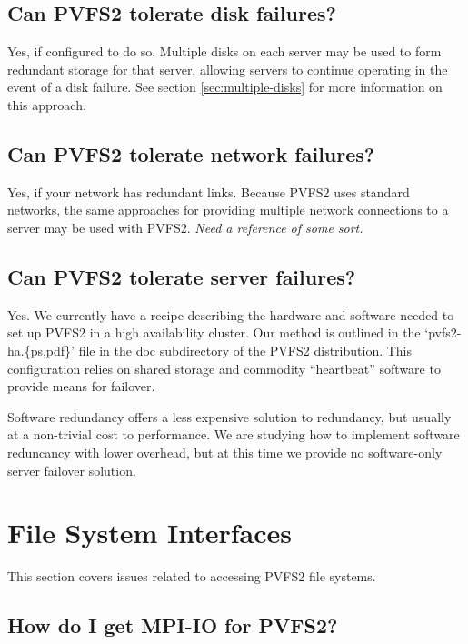 \documentclass[11pt,letterpaper]{article}
\begin{document}
\subsection{Can PVFS2 tolerate disk failures?}

Yes, if configured to do so.  Multiple disks on each server may be used to
form redundant storage for that server, allowing servers to continue operating
in the event of a disk failure.  See section \ref{sec:multiple-disks} for more
information on this approach.

\subsection{Can PVFS2 tolerate network failures?}

Yes, if your network has redundant links.  Because PVFS2 uses standard
networks, the same approaches for providing multiple network connections to a
server may be used with PVFS2.  \emph{Need a reference of some sort.}

\subsection{Can PVFS2 tolerate server failures?}

Yes.  We currently have a recipe describing the hardware and software
needed to set up PVFS2 in a high availability cluster.  Our method is
outlined in the `pvfs2-ha.\{ps,pdf\}' file in the doc subdirectory of the
PVFS2 distribution.  This configuration relies on shared storage and
commodity ``heartbeat'' software to provide means for failover.

Software redundancy offers a less expensive solution to redundancy,
but usually at a non-trivial cost to performance.  We are studying how
to implement software reduncancy with lower overhead, but at this time
we provide no software-only server failover solution.

%
%
\section{File System Interfaces}

This section covers issues related to accessing PVFS2 file systems.

\subsection{How do I get MPI-IO for PVFS2?}
\end{document}
